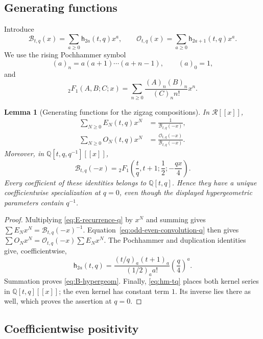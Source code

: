 \documentclass{amsart}
\newtheorem{lemma}[lemma]{Lemma}
\theoremstyle{definition}
\theoremstyle{remark}
\begin{document}
\subsection{Generating functions}

Introduce
\begin{equation*}
 \mathcal B_{t,q}(x)
 =\sum_{a\geq0}\mathsf h_{2a}(t,q)x^a,
 \qquad
 \mathcal O_{t,q}(x)
 =\sum_{a\geq0}\mathsf h_{2a+1}(t,q)x^a.
\end{equation*}
We use the rising Pochhammer symbol
\[
 (a)_n=a(a+1)\cdots(a+n-1),
 \qquad (a)_0=1,
\]
and
\[
 {}_2F_1(A,B;C;x)
 =\sum_{n\geq0}
  \frac{(A)_n(B)_n}
       {(C)_n n!}x^n.
\]

\begin{lemma}[Generating functions for the zigzag compositions]
\label{lem:staircase-generating-series}
In \(\mathcal R[[x]]\),
\begin{align*}
 \sum_{N\geq0}E_N(t,q)x^N
 &=\frac{1}{\mathcal B_{t,q}(-x)},
 \\
 \sum_{N\geq0}O_N(t,q)x^N
 &=\frac{\mathcal O_{t,q}(-x)}{\mathcal B_{t,q}(-x)}.
\end{align*}
Moreover, in \(\mathbb Q[t,q,q^{-1}][[x]]\),
\begin{equation}
 \mathcal B_{t,q}(-x)
 ={}_2F_1\left(\frac tq,t+1;\frac12;-\frac{qx}{4}\right).
 \label{eq:B-hypergeom}
\end{equation}
Every coefficient of these identities belongs to $\mathbb Q[t,q]$.
Hence they have a unique coefficientwise
specialization at \(q=0\), even though the displayed hypergeometric
parameters contain \(q^{-1}\).
\end{lemma}

\begin{proof}
Multiplying \eqref{eq:E-recurrence-q} by \(x^N\) and summing gives
\(\sum E_Nx^N=\mathcal B_{t,q}(-x)^{-1}\).
Equation~\eqref{eq:odd-even-convolution-q} then gives
\(\sum O_Nx^N=\mathcal O_{t,q}(-x)\sum E_Nx^N\).
The Pochhammer and duplication identities give, coefficientwise,
\begin{equation*}
 \mathsf h_{2a}(t,q)
 =\frac{(t/q)_a(t+1)_a}
        {(1/2)_a a!}\left(\frac q4\right)^a.
\end{equation*}
Summation proves \eqref{eq:B-hypergeom}.
Finally, \eqref{eq:hm-tq} places both kernel series in
\(\mathbb Q[t,q][[x]]\); the even kernel has constant term \(1\).
Its inverse lies there as well, which proves the assertion at \(q=0\).
\end{proof}

\subsection{Coefficientwise positivity}
\end{document}
